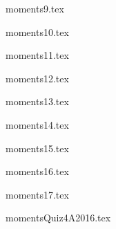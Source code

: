 \documentclass[9pt,xcolor={svgnames, x11names}]{beamer}
\def\scale{1} %
\begin{document}
\begin{frame}{moments9.tex }
	\def\scale{0.8}
	\centering
	
\end{frame}
\begin{frame}{moments10.tex }
	\def\scale{0.8}
	\centering
	
\end{frame}
\begin{frame}{moments11.tex }
	\def\scale{0.8}
	\centering
	
\end{frame}
\begin{frame}{moments12.tex }
	\def\scale{0.8}
	\centering
	
\end{frame}
\begin{frame}{moments13.tex }
	\def\scale{0.8}
	\centering
	
\end{frame}
\begin{frame}{moments14.tex }
	\def\scale{0.7}
	\centering
	
\end{frame}
\begin{frame}{moments15.tex }
	\def\scale{0.8}
	\centering
	
\end{frame}
\begin{frame}{moments16.tex }
	\def\scale{1}
	\centering
	
\end{frame}
\begin{frame}{moments17.tex }
	\def\scale{0.6}
	\centering
	
\end{frame}
\begin{frame}{momentsQuiz4A2016.tex }
	\def\scale{0.6}
	\centering
	
\end{frame}
\end{document}
